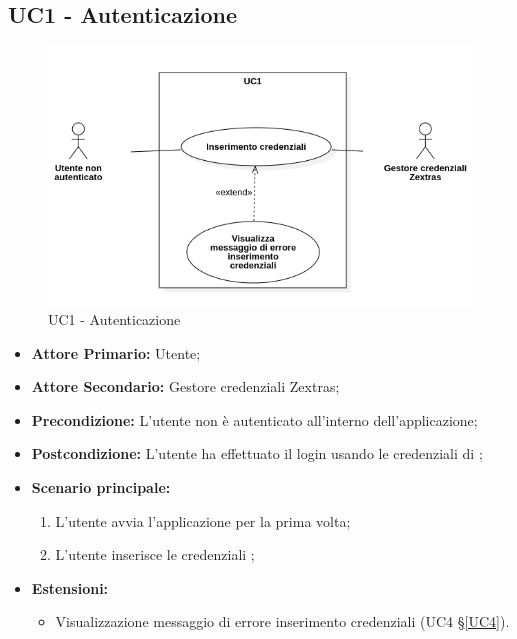 \subsection{UC1 - Autenticazione}
\begin{figure}[H]
    \centering
    \includegraphics[scale = 0.7]{components/img/UC1.png}
    \caption{UC1 - Autenticazione}
\end{figure}
\begin{itemize}
\item \textbf{Attore Primario:} Utente;
\item \textbf{Attore Secondario:} Gestore credenziali Zextras;
\item \textbf{Precondizione:} L'utente non è autenticato all'interno dell'applicazione;
\item \textbf{Postcondizione:} L'utente ha effettuato il login usando le credenziali di ;
\item \textbf{Scenario principale:}
    \begin{enumerate}
    \item L'utente avvia l'applicazione per la prima volta;
    \item L'utente inserisce le credenziali ;
    \end{enumerate}
\item \textbf{Estensioni:}
\begin{itemize}
\item Visualizzazione messaggio di errore inserimento credenziali (UC4 \S{}\ref{UC4}).
\end{itemize}
\end{itemize}